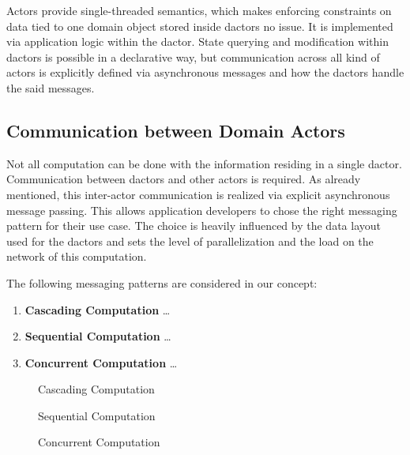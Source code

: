     Actors provide single-threaded semantics, which makes enforcing constraints on data tied to one domain object stored inside \glspl{dactor} no issue.
    It is implemented via application logic within the \gls{dactor}.
    State querying and modification within \glspl{dactor} is possible in a declarative way, but communication across all kind of actors is explicitly defined via asynchronous messages and how the \glspl{dactor} handle the said messages.

  \subsection{Communication between Domain Actors}
    Not all computation can be done with the information residing in a single \gls{dactor}.
    Communication between \glspl{dactor} and other actors is required.
    As already mentioned, this inter-actor communication is realized via explicit asynchronous message passing.
    This allows application developers to chose the right messaging pattern for their use case.
    The choice is heavily influenced by the data layout used for the \glspl{dactor} and sets the level of parallelization and the load on the network of this computation.

    The following messaging patterns are considered in our concept:
    \begin{enumerate}
      \item\label{enum:comp_pattern_1} \textbf{Cascading Computation} \dots
      \item\label{enum:comp_pattern_2} \textbf{Sequential Computation} \dots
      \item\label{enum:comp_pattern_3} \textbf{Concurrent Computation} \dots
    \end{enumerate}

    \begin{figure}
      \centering
      
      \caption{Cascading Computation}
      \label{fig:comp_pattern_1}
    \end{figure}

    \begin{figure}
      \centering
      
      \caption{Sequential Computation}
      \label{fig:comp_pattern_2}
    \end{figure}

    \begin{figure}
      \centering
      
      \caption{Concurrent Computation}
      \label{fig:comp_pattern_3}
    \end{figure}

